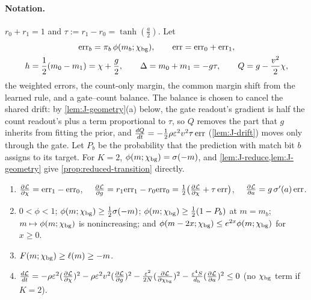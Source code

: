 \paragraph{Notation.} $r_0+r_1=1$ and $\tau:=r_1-r_0=\tanh(\frac{a}{2})$. Let
\begin{gather*}
 \mathrm{err}_b=\pi_b\,\phi(m_b;\cbg),\qquad \mathrm{err}=\mathrm{err}_0+\mathrm{err}_1,\\
 h=\tfrac{1}{2}(m_0-m_1)=\cnt+\tfrac{g}{2},\qquad \Delta=m_0+m_1=-g\tau,\qquad Q=g-\tfrac{v^2}{2}\cnt,
\end{gather*}
the weighted errors, the count-only margin, the common margin shift from the learned rule, and a gate--count balance. The balance is
chosen to cancel the shared drift: by \cref{lem:J-geometry}(a) below, the gate readout's gradient is half the count readout's plus a
term proportional to $\tau$, so $Q$ removes the part that $g$ inherits from fitting the prior, and $\ddt{Q}=-\frac{1}{2}\rho\initscale^2v^2\tau\,\mathrm{err}$
(\cref{lem:J-drift}) moves only through the gate. Let $P_b$ be the
probability that the prediction with match bit $b$ assigns to its target.
For $K=2$, $\phi(m;\chi_{\mathrm{bg}})=\sigma(-m)$, and \cref{lem:J-reduce,lem:J-geometry} give \cref{prop:reduced-transition} directly.

\begin{lemma}[Derivatives]
\label{lem:J-geometry}
\begin{enumerate}[label=(\alph*),leftmargin=*,itemsep=2pt,topsep=3pt]
\item $\pd{\mathcal L}{\cnt}=\mathrm{err}_1-\mathrm{err}_0$, $\quad\pd{\mathcal L}{g}=r_1\mathrm{err}_1-r_0\mathrm{err}_0=\tfrac{1}{2}\bigl(\pd{\mathcal L}{\cnt}+\tau\,\mathrm{err}\bigr)$, $\quad\pd{\mathcal L}{a}=g\,\sigma'(a)\,\mathrm{err}$.
\item $0<\phi<1$; $\phi(m;\chi_{\mathrm{bg}})\ge\frac{1}{2}\sigma(-m)$; $\phi(m;\chi_{\mathrm{bg}})\ge\frac{1}{2}(1-P_b)$ at $m=m_b$; $m\mapsto\phi(m;\chi_{\mathrm{bg}})$ is nonincreasing; and
$\phi(m-2x;\chi_{\mathrm{bg}})\le e^{2x}\phi(m;\chi_{\mathrm{bg}})$ for $x\ge0$.
\item $F(m;\chi_{\mathrm{bg}})\ge\ell(m)\ge-m$.
\item $\ddt{\mathcal L}=-\rho\initscale^2(\pd{\mathcal L}{\cnt})^2-\rho\initscale^2v^2(\pd{\mathcal L}{g})^2-\frac{\initscale^2}{2N}(\pd{\mathcal L}{\cbg})^2-\frac{\initscale^4S}{d_{\mathrm h}}(\pd{\mathcal L}{a})^2\le0$ (no $\chi_{\mathrm{bg}}$ term if $K=2$).
\end{enumerate}
\end{lemma}

